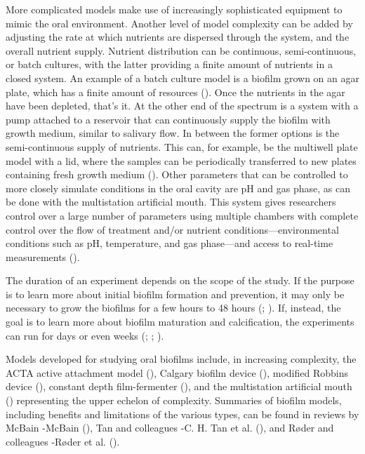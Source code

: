 \documentclass[
  b5paper,
]{book}
\begin{document}
More complicated models make use of increasingly sophisticated equipment
to mimic the oral environment. Another level of model complexity can be
added by adjusting the rate at which nutrients are dispersed through the
system, and the overall nutrient supply. Nutrient distribution can be
continuous, semi-continuous, or batch cultures, with the latter
providing a finite amount of nutrients in a closed system. An example of
a batch culture model is a biofilm grown on an agar plate, which has a
finite amount of resources
(). Once
the nutrients in the agar have been depleted, that's it. At the other
end of the spectrum is a system with a pump attached to a reservoir that
can continuously supply the biofilm with growth medium, similar to
salivary flow. In between the former options is the semi-continuous
supply of nutrients. This can, for example, be the multiwell plate model
with a lid, where the samples can be periodically transferred to new
plates containing fresh growth medium
(). Other
parameters that can be controlled to more closely simulate conditions in
the oral cavity are pH and gas phase, as can be done with the
multistation artificial mouth. This system gives researchers control
over a large number of parameters using multiple chambers with complete
control over the flow of treatment and/or nutrient
conditions---environmental conditions such as pH, temperature, and gas
phase---and access to real-time measurements
().

The duration of an experiment depends on the scope of the study. If the
purpose is to learn more about initial biofilm formation and prevention,
it may only be necessary to grow the biofilms for a few hours to 48
hours (;
). If, instead,
the goal is to learn more about biofilm maturation and calcification,
the experiments can run for days or even weeks
(;
;
).

Models developed for studying oral biofilms include, in increasing
complexity, the ACTA active attachment model
(), Calgary
biofilm device (), modified Robbins device
(),
constant depth film-fermenter
(), and
the multistation artificial mouth
()
representing the upper echelon of complexity. Summaries of biofilm
models, including benefits and limitations of the various types, can be
found in reviews by McBain -McBain
(), Tan and colleagues -C.
H. Tan et al. (), and Røder and
colleagues -Røder et al.
().
\end{document}
